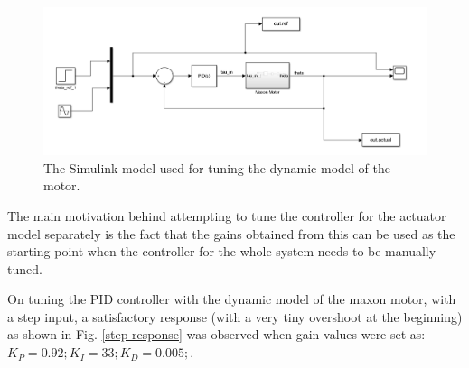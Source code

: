 \documentclass[a4paper,12pt]{report}
\begin{document}
\begin{figure}[H]
	\includegraphics[width=\textwidth]{images/Motor-tuning.png}
	\caption{The Simulink model used for tuning the dynamic model of the motor.}
	\label{motor-tuning}
\end{figure}

The main motivation behind attempting to tune the controller for the  actuator model separately is the fact that the gains obtained from this can be used as the starting point when the controller for the whole system needs to be manually tuned. 

On tuning the PID controller with the dynamic model of the maxon motor, with a step input, a satisfactory response (with a very tiny overshoot at the beginning) as shown in Fig. \ref{step-response} was observed when gain values were set as: $K_P=0.92; K_I=33;K_D=0.005;$.
\end{document}
